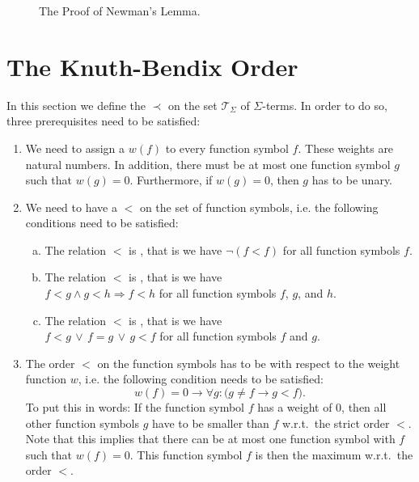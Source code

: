 \begin{figure}[!ht]
  \centering
  \caption{The Proof of Newman's Lemma.}
  \label{fig:newman.pdf}
\end{figure}

\section{The Knuth-Bendix Order}
In this section we define the  $\prec$ on the set $\mathcal{T}_\Sigma$ of
$\Sigma$-terms.  In order to do so, three prerequisites need to be satisfied:
\begin{enumerate}
\item We need to assign a  $w(f)$ to every function symbol $f$.  These weights are 
      natural numbers.  In addition, there must be at most one function symbol $g$ such that $w(g) = 0$.
      Furthermore, if $w(g) = 0$, then $g$ has to be unary.
\item We need to have a  $<$ on the set of function symbols, i.e. the following
      conditions need to be satisfied:
      \begin{enumerate}[(a)]
      \item The relation $<$ is , that is we have $\neg (f < f)$ for all function symbols $f$.
      \item The relation $<$ is , that is we have 
            \\[0.2cm]
            \hspace*{1.3cm}
            $f < g \wedge g < h \Rightarrow f < h$ \quad for all function symbols $f$, $g$, and $h$.
      \item The relation $<$ is , that is we have 
            \\[0.2cm]
            \hspace*{1.3cm}
            $f < g \,\vee\, f = g \,\vee\, g < f$ \quad for all function symbols $f$ and $g$.
      \end{enumerate}
\item The order $<$ on the function symbols has to be  with respect to the weight function
      $w$, i.e. the following condition needs to be satisfied:
   $$ w(f) = 0 \rightarrow \forall g:  \bigl(g \not=f \rightarrow g < f\bigr). $$
      To put this in words: If the function symbol $f$ has a weight of $0$, then 
      all other function symbols $g$ have to be smaller than $f$ w.r.t.~the strict order $<$.
      Note that this implies that there can be at most one function symbol with $f$ such that $w(f) = 0$. 
      This function symbol $f$ is then the maximum w.r.t.~the order $<$.
\end{enumerate}
